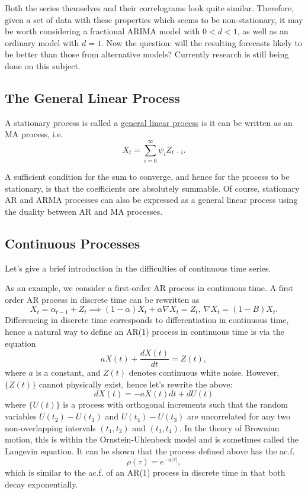 Both the series themselves and their correlograms look quite similar. Therefore, given a set of data with these 
properties which seems to be non-stationary, it may be worth considering a fractional ARIMA model with 
$0 < d < 1$, as well as an ordinary model with $d = 1$. Now the question: will the resulting forecasts likely to 
be better than those from alternative models? Currently research is still being done on this subject.



\subsection{The General Linear Process}
\begin{definition*}[]
A stationary process is called a \underline{general linear process} is it can be written as an MA process, i.e. 
\[ X_t = \sum_{i = 0}^{\infty} \psi_i Z_{t-i}. \]
\end{definition*}
A sufficient condition for the sum to converge, and hence for the process to be stationary, is that the 
coefficients are absolutely summable. Of course, stationary AR and ARMA processes can also be expressed as a 
general linear process using the duality between AR and MA processes.



\subsection{Continuous Processes}
Let's give a brief introduction in the difficulties of continuous time series.

As an example, we consider a first-order AR process in continuous time. A first order AR process in discrete 
time can be rewritten as 
\[ X_t = \alpha_{t - 1} + Z_t \implies (1 - \alpha)X_t + \alpha \nabla X_t = Z_t, \ \nabla X_t = 
(1 - B)X_t. \]
Differencing in discrete time corresponds to differentiation in continuous time, hence a natural way to define 
an AR(1) process in continuous time is via the equation 
\[ aX(t) + \frac{dX(t)}{dt} = Z(t), \]
where $a$ is a constant, and $Z(t)$ denotes continuous white noise. However, $\{ Z(t) \}$ cannot physically 
exist, hence let's rewrite the above:
\[ dX(t) = -aX(t)dt + dU(t) \]
where $\{ U(t) \}$ is a process with orthogonal increments such that the random variables $U(t_2) - U(t_1)$ and 
$U(t_4) - U(t_3)$ are uncorrelated for any two non-overlapping intervals $(t_1, t_2)$ and $(t_3, t_4)$. In the 
theory of Brownian motion, this is within the Ornstein-Uhlenbeck model and is sometimes called the Langevin 
equation. It can be shown that the process defined above has the ac.f. 
\[ \rho(\tau) = e^{-a |\tau|}, \]
which is similar to the ac.f. of an AR(1) process in discrete time in that both decay exponentially.

